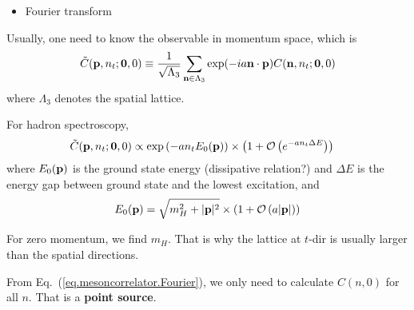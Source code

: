 \begin{itemize}
  \item Fourier transform
\end{itemize}

Usually, one need to know the observable in momentum space, which is
\begin{equation}
\begin{split}
&\tilde{C}({\bf p},n_t;{\bf 0}, 0)\equiv \frac{1}{\sqrt{\Lambda _3}}\sum _{{\bf n}\in \Lambda _3}\exp (-ia {\bf n}\cdot {\bf p})C({\bf n},n_t;{\bf 0},0)\\
\end{split}
\label{eq.mesoncorrelator.Fourier}
\end{equation}
where $\Lambda _3$ denotes the spatial lattice.

For hadron spectroscopy, 
\begin{equation}
\begin{split}
&\tilde{C}({\bf p},n_t;{\bf 0}, 0)\propto \exp\left(-an_tE_0({\bf p})\right)\times \left(1+\mathcal{O}\left(e^{-an_t\Delta E}\right)\right)
\end{split}
\end{equation}
where $E_0({\bf p})$ is the ground state energy (dissipative relation?) and $\Delta E$ is the energy gap between ground state and the lowest excitation, and
\begin{equation}
\begin{split}
&E_0({\bf p})=\sqrt{m_H^2+|{\bf p}|^2}\times \left(1+\mathcal{O}\left(a|{\bf p}|\right)\right)\\
\end{split}
\end{equation}

For zero momentum, we find $m_H$. That is why the lattice at $t$-dir is usually larger than the spatial directions.

From Eq.~(\ref{eq.mesoncorrelator.Fourier}), we only need to calculate $C(n,0)$ for all $n$. That is a \textbf{point source}.

